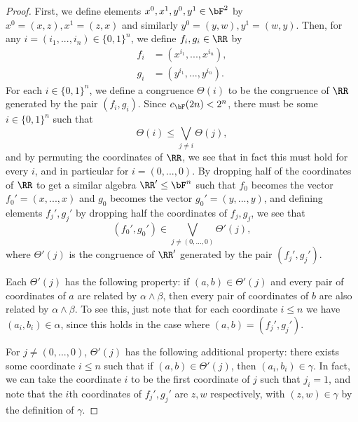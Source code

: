 \begin{proof}
First, we define elements $x^0, x^1, y^0, y^1 \in \bF^2$ by $x^0 = (x,z), x^1 = (z,x)$ and similarly $y^0 = (y,w), y^1 = (w,y)$. Then, for any $i = (i_1, ..., i_n) \in \{0,1\}^n$, we define $f_i, g_i \in \RR$ by
\begin{align*}
f_i &= (x^{i_1}, ..., x^{i_n}),\\
g_i &= (y^{i_1}, ..., y^{i_n}).
\end{align*}
For each $i \in \{0,1\}^n$, we define a congruence $\Theta(i)$ to be the congruence of $\RR$ generated by the pair $(f_i, g_i)$. Since $c_{\bF}(2n) < 2^n$, there must be some $i \in \{0,1\}^n$ such that
\[
\Theta(i) \le \bigvee_{j \ne i} \Theta(j),
\]
and by permuting the coordinates of $\RR$, we see that in fact this must hold for every $i$, and in particular for $i = (0, ..., 0)$. By dropping half of the coordinates of $\RR$ to get a similar algebra $\RR' \le \bF^n$ such that $f_0$ becomes the vector $f_0' = (x, ..., x)$ and $g_0$ becomes the vector $g_0' = (y, ..., y)$, and defining elements $f_j', g_j'$ by dropping half the coordinates of $f_j, g_j$, we see that
\[
(f_0', g_0') \in \bigvee_{j \ne (0, ..., 0)} \Theta'(j),
\]
where $\Theta'(j)$ is the congruence of $\RR'$ generated by the pair $(f_j', g_j')$.

Each $\Theta'(j)$ has the following property: if $(a,b) \in \Theta'(j)$ and every pair of coordinates of $a$ are related by $\alpha \wedge \beta$, then every pair of coordinates of $b$ are also related by $\alpha \wedge \beta$. To see this, just note that for each coordinate $i \le n$ we have $(a_i,b_i) \in \alpha$, since this holds in the case where $(a,b) = (f_j', g_j')$.

For $j \ne (0, ..., 0)$, $\Theta'(j)$ has the following additional property: there exists some coordinate $i \le n$ such that if $(a,b) \in \Theta'(j)$, then $(a_i,b_i) \in \gamma$. In fact, we can take the coordinate $i$ to be the first coordinate of $j$ such that $j_i = 1$, and note that the $i$th coordinates of $f_j', g_j'$ are $z, w$ respectively, with $(z,w) \in \gamma$ by the definition of $\gamma$.


\end{proof}
